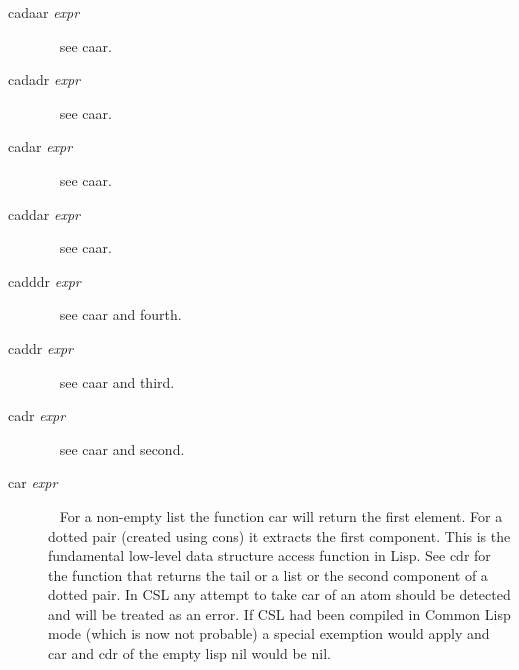 \documentclass[a4paper,11pt]{article}
\begin{document}
\begin{description}
\item[{\ttfamily cadaar} {\itshape expr}]  ~\newline
see {\ttfamily caar}.

\item[{\ttfamily cadadr} {\itshape expr}]  ~\newline
see {\ttfamily caar}.

\item[{\ttfamily cadar} {\itshape expr}]  ~\newline
see {\ttfamily caar}.

\item[{\ttfamily caddar} {\itshape expr}]  ~\newline
see {\ttfamily caar}.

\item[{\ttfamily cadddr} {\itshape expr}]  ~\newline
see {\ttfamily caar} and {\ttfamily fourth}.

\item[{\ttfamily caddr} {\itshape expr}]  ~\newline
see {\ttfamily caar} and {\ttfamily third}.

\item [{\ttfamily  cadr} {\itshape expr}]  ~\newline
see {\ttfamily caar} and {\ttfamily second}.

\item [{\ttfamily car} {\itshape expr}]  ~\newline
For a non-empty list the function {\ttfamily car} will return the
first element. For a dotted pair (created using {\ttfamily cons})
it extracts the first component. This is the fundamental low-level
data structure access function in Lisp. See {\ttfamily cdr} for the
function that returns the tail or a list or the second component of
a dotted pair. In CSL any attempt to take {\ttfamily car} of an atom
should be detected and will be treated as an error. If CSL had been
compiled in Common Lisp mode (which is now not probable) a special
exemption would apply and {\ttfamily car} and {\ttfamily cdr} of the
empty lisp {\ttfamily nil} would be {\ttfamily nil}.


\end{description}
\end{document}

